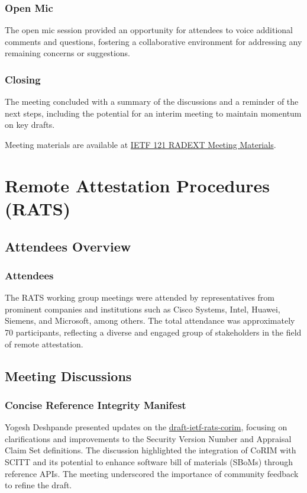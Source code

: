 \documentclass{article}
\begin{document}
\subsubsection{Open Mic}

The open mic session provided an opportunity for attendees to voice additional comments and questions, fostering a collaborative environment for addressing any remaining concerns or suggestions.

\subsubsection{Closing}

The meeting concluded with a summary of the discussions and a reminder of the next steps, including the potential for an interim meeting to maintain momentum on key drafts.

Meeting materials are available at \href{https://www.ietf.org/proceedings/121/radext.html}{IETF 121 RADEXT Meeting Materials}.



\newpage

\section{Remote Attestation Procedures (RATS)}

\subsection{Attendees Overview}
\subsubsection{Attendees}
The RATS working group meetings were attended by representatives from prominent companies and institutions such as Cisco Systems, Intel, Huawei, Siemens, and Microsoft, among others. The total attendance was approximately 70 participants, reflecting a diverse and engaged group of stakeholders in the field of remote attestation.

\subsection{Meeting Discussions}

\subsubsection{Concise Reference Integrity Manifest}
Yogesh Deshpande presented updates on the \href{https://datatracker.ietf.org/doc/html/draft-ietf-rats-corim}{draft-ietf-rats-corim}, focusing on clarifications and improvements to the Security Version Number and Appraisal Claim Set definitions. The discussion highlighted the integration of CoRIM with SCITT and its potential to enhance software bill of materials (SBoMs) through reference APIs. The meeting underscored the importance of community feedback to refine the draft.
\end{document}
